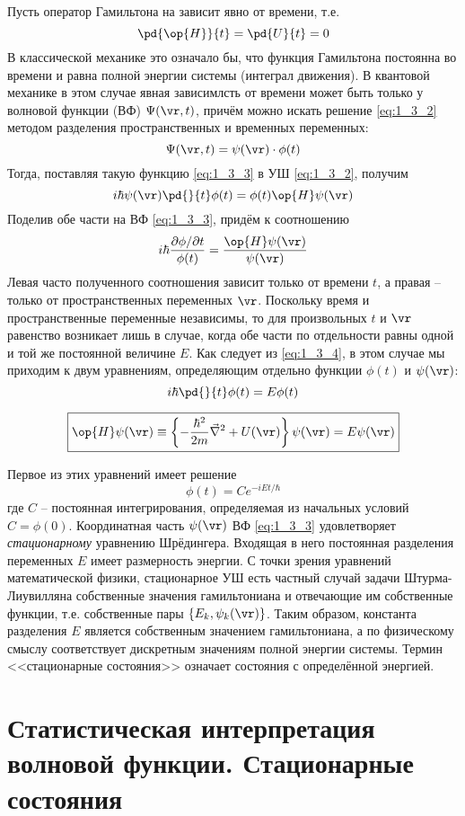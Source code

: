 Пусть оператор Гамильтона на зависит явно от времени, т.е.
$$\pd{\op{H}}{t} = \pd{U}{t} = 0$$
В классической механике это означало бы, что функция Гамильтона постоянна во времени и равна полной энергии системы (интеграл движения). В квантовой механике в этом случае явная зависимлсть от времени может быть только у волновой функции (ВФ) $\Psi(\vr,t)$, причём можно искать решение \eqref{eq:1_3_2} методом разделения пространственных и временных переменных:%
%
\begin{equation}
\label{eq:1_3_3}
\Psi(\vr,t) = \psi(\vr) \cdot \phi (t)
\end{equation}%
%
Тогда, поставляя такую функцию \eqref{eq:1_3_3} в УШ \eqref{eq:1_3_2}, получим
$$
i \hbar \psi(\vr) \pd{}{t} \phi (t) = \phi (t) \op{H} \psi(\vr)
$$%
%
Поделив обе части на ВФ \eqref{eq:1_3_3}, придём к соотношению
\begin{equation}
\label{eq:1_3_4}
i \hbar \frac{\partial \phi / \partial t}{\phi(t)} = \frac{\op{H} \psi(\vr)}{\psi(\vr)}
\end{equation}
Левая часто полученного соотношения зависит только от времени $t$, а правая -- только от пространственных переменных $\vr$. Поскольку время и пространственные переменные независимы, то для произвольных $t$ и $\vr$ равенство возникает лишь в случае, когда обе части по отдельности равны одной и той же постоянной величине $E$. Как следует из \eqref{eq:1_3_4}, в этом случае мы приходим к двум уравнениям, определяющим отдельно функции $\phi(t)$ и $\psi(\vr)$:
\begin{equation}
\label{eq:1_3_5}
i \hbar \pd{}{t} \phi(t) = E \phi(t)
\end{equation}

\begin{equation}
\label{eq:1_3_6}
\boxed{\op{H} \psi(\vr) \equiv \left\{ -\frac{\hbar^2}{2m} \vec{\nabla}^2 + U(\vr) \right\}\psi(\vr) = E\psi(\vr)}
\end{equation}

Первое из этих уравнений имеет решение
$$
\phi(t)=C e^{-iEt/\hbar}
$$
где $C$ -- постоянная интегрирования, определяемая из начальных условий $C = \phi(0)$. Координатная часть $\psi(\vr)$ ВФ \eqref{eq:1_3_3} удовлетворяет {\em стационарному} уравнению Шрёдингера. Входящая в него постоянная разделения переменных $E$ имеет размерность энергии. С точки зрения уравнений математической физики, стационарное УШ есть частный случай задачи Штурма-Лиувилля\footnotemark на собственные значения гамильтониана и отвечающие им собственные функции, т.е. собственные пары $\{E_k, \psi_k(\vr)\}$. Таким образом, константа разделения $E$ является собственным значением гамильтониана, а по физическому смыслу соответствует дискретным значениям полной энергии системы. Термин <<стационарные состояния>> означает состояния с определённой энергией.
%
\begin{sloppypar}
  \section{Статистическая интерпретация волновой функции. Стационарные состояния}
\end{sloppypar}

